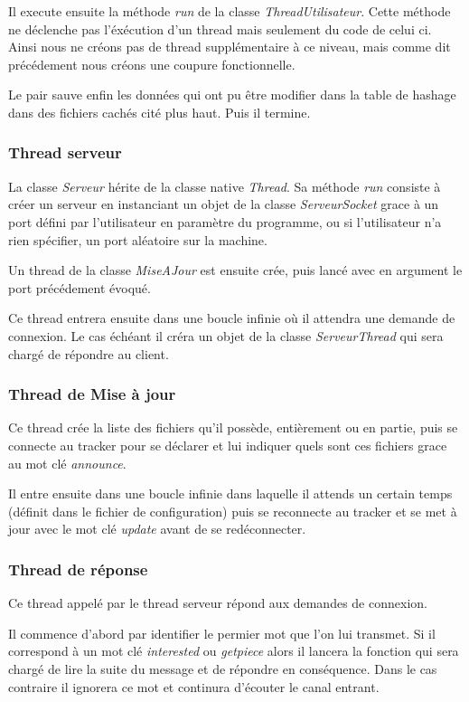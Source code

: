 Il execute ensuite la méthode \textit{run} de la classe
\textit{ThreadUtilisateur}.  Cette méthode ne déclenche pas
l'éxécution d'un thread mais seulement du code de celui ci. Ainsi nous
ne créons pas de thread supplémentaire à ce niveau, mais comme dit
précédement nous créons une coupure fonctionnelle.

Le pair sauve enfin les données qui ont pu être modifier dans la table
de hashage dans des fichiers cachés cité plus haut. Puis il termine.

\subsubsection{Thread serveur}
La classe \textit{Serveur} hérite de la classe native \textit{Thread}.
Sa méthode \textit{run} consiste à créer un serveur en instanciant un
objet de la classe \textit{ServeurSocket} grace à un port défini par
l'utilisateur en paramètre du programme, ou si l'utilisateur n'a rien
spécifier, un port aléatoire sur la machine.


Un thread de la classe \textit{MiseAJour} est ensuite crée, puis lancé avec en
argument le port précédement évoqué.

Ce thread entrera ensuite dans une boucle infinie où il attendra une
demande de connexion. Le cas échéant il créra un objet de la classe
\textit{ServeurThread} qui sera chargé de répondre au client.


\subsubsection{Thread de Mise à jour}
Ce thread crée la liste des fichiers qu'il possède, entièrement ou en
partie, puis se connecte au tracker pour se déclarer et lui indiquer
quels sont ces fichiers grace au mot clé \textit{announce}.

Il entre ensuite dans une boucle infinie dans laquelle il attends un
certain temps (définit dans le fichier de configuration) puis se
reconnecte au tracker et se met à jour avec le mot clé \textit{update}
avant de se redéconnecter.


\subsubsection{Thread de réponse}
Ce thread appelé par le thread serveur répond aux demandes de
connexion.

Il commence d'abord par identifier le permier mot que l'on lui
transmet. Si il correspond à un mot clé \textit{interested} ou
\textit{getpiece} alors il lancera la fonction qui sera chargé de lire
la suite du message et de répondre en conséquence. Dans le cas
contraire il ignorera ce mot et continura d'écouter le canal entrant.

